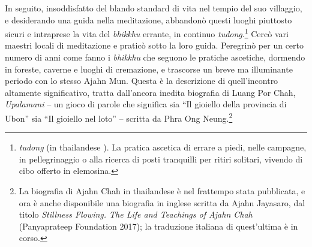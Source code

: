 In seguito, insoddisfatto del blando standard di vita nel tempio del suo
villaggio, e desiderando una guida nella meditazione, abbandonò questi
luoghi piuttosto sicuri e intraprese la vita del \emph{bhikkhu} errante,
in continuo \emph{tudong}.\footnote{\emph{tudong} (in thailandese
  ). La pratica ascetica di errare a piedi, nelle campagne, in
  pellegrinaggio o alla ricerca di posti tranquilli per ritiri solitari,
  vivendo di cibo offerto in elemosina.} Cercò vari maestri locali di
meditazione e praticò sotto la loro guida. Peregrinò per un certo numero
di anni come fanno i \emph{bhikkhu} che seguono le pratiche ascetiche,
dormendo in foreste, caverne e luoghi di cremazione, e trascorse un
breve ma illuminante periodo con lo stesso Ajahn Mun. Questa è la
descrizione di quell'incontro altamente significativo, tratta
dall'ancora inedita biografia di Luang Por Chah, \emph{Upalamani} -- un
gioco di parole che significa sia ``Il gioiello della provincia di
Ubon'' sia ``Il gioiello nel loto'' -- scritta da Phra Ong
Neung.\footnote{%
  La biografia di Ajahn Chah in thailandese è nel frattempo stata pubblicata, e
  ora è anche disponibile una biografia in inglese scritta da Ajahn Jayasaro,
  dal titolo \emph{Stillness Flowing. The Life and Teachings of Ajahn Chah}
  (Panyaprateep Foundation 2017); la traduzione italiana di quest’ultima è in
  corso.}

